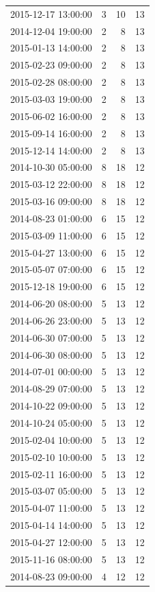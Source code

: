 \begin{tabular}{lrrr}
2015-12-17 13:00:00 & 3 & 10 & 13 \\
2014-12-04 19:00:00 & 2 & 8 & 13 \\
2015-01-13 14:00:00 & 2 & 8 & 13 \\
2015-02-23 09:00:00 & 2 & 8 & 13 \\
2015-02-28 08:00:00 & 2 & 8 & 13 \\
2015-03-03 19:00:00 & 2 & 8 & 13 \\
2015-06-02 16:00:00 & 2 & 8 & 13 \\
2015-09-14 16:00:00 & 2 & 8 & 13 \\
2015-12-14 14:00:00 & 2 & 8 & 13 \\
2014-10-30 05:00:00 & 8 & 18 & 12 \\
2015-03-12 22:00:00 & 8 & 18 & 12 \\
2015-03-16 09:00:00 & 8 & 18 & 12 \\
2014-08-23 01:00:00 & 6 & 15 & 12 \\
2015-03-09 11:00:00 & 6 & 15 & 12 \\
2015-04-27 13:00:00 & 6 & 15 & 12 \\
2015-05-07 07:00:00 & 6 & 15 & 12 \\
2015-12-18 19:00:00 & 6 & 15 & 12 \\
2014-06-20 08:00:00 & 5 & 13 & 12 \\
2014-06-26 23:00:00 & 5 & 13 & 12 \\
2014-06-30 07:00:00 & 5 & 13 & 12 \\
2014-06-30 08:00:00 & 5 & 13 & 12 \\
2014-07-01 00:00:00 & 5 & 13 & 12 \\
2014-08-29 07:00:00 & 5 & 13 & 12 \\
2014-10-22 09:00:00 & 5 & 13 & 12 \\
2014-10-24 05:00:00 & 5 & 13 & 12 \\
2015-02-04 10:00:00 & 5 & 13 & 12 \\
2015-02-10 10:00:00 & 5 & 13 & 12 \\
2015-02-11 16:00:00 & 5 & 13 & 12 \\
2015-03-07 05:00:00 & 5 & 13 & 12 \\
2015-04-07 11:00:00 & 5 & 13 & 12 \\
2015-04-14 14:00:00 & 5 & 13 & 12 \\
2015-04-27 12:00:00 & 5 & 13 & 12 \\
2015-11-16 08:00:00 & 5 & 13 & 12 \\
2014-08-23 09:00:00 & 4 & 12 & 12 \\

\end{tabular}
